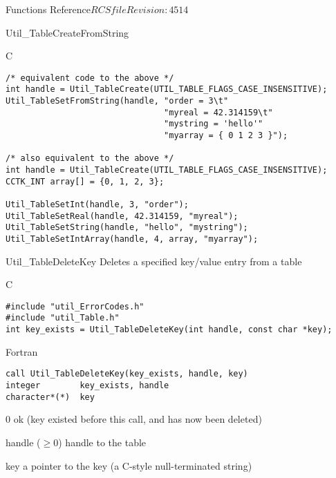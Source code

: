 \begin{cactuspart}{ Functions Reference}{$RCSfile$}{$Revision: 4514 $}
\begin{FunctionDescription}{Util\_TableCreateFromString}
\begin{ExampleSection}
\begin{Example}{C}
\begin{verbatim}
/* equivalent code to the above */
int handle = Util_TableCreate(UTIL_TABLE_FLAGS_CASE_INSENSITIVE);
Util_TableSetFromString(handle, "order = 3\t"
                                "myreal = 42.314159\t"
                                "mystring = 'hello'"
                                "myarray = { 0 1 2 3 }");

/* also equivalent to the above */
int handle = Util_TableCreate(UTIL_TABLE_FLAGS_CASE_INSENSITIVE);
CCTK_INT array[] = {0, 1, 2, 3};

Util_TableSetInt(handle, 3, "order");
Util_TableSetReal(handle, 42.314159, "myreal");
Util_TableSetString(handle, "hello", "mystring");
Util_TableSetIntArray(handle, 4, array, "myarray");
\end{verbatim}
\end{Example}
\end{ExampleSection}
\end{FunctionDescription}


\begin{FunctionDescription}{Util\_TableDeleteKey}
\label{Util-TableDeleteKey}
Deletes a specified key/value entry from a table

\begin{SynopsisSection}
\begin{Synopsis}{C}
\begin{verbatim}
#include "util_ErrorCodes.h"
#include "util_Table.h"
int key_exists = Util_TableDeleteKey(int handle, const char *key);
\end{verbatim}
\end{Synopsis}
\begin{Synopsis}{Fortran}
\begin{verbatim}
call Util_TableDeleteKey(key_exists, handle, key)
integer        key_exists, handle
character*(*)  key
\end{verbatim}
\end{Synopsis}
\end{SynopsisSection}

\begin{ResultSection}
\begin{Result}{\rm 0}
ok (key existed before this call, and has now been deleted)
\end{Result}
\end{ResultSection}

\begin{ParameterSection}
\begin{Parameter}{handle ($\ge 0$)}
handle to the table
\end{Parameter}
\begin{Parameter}{key}
a pointer to the key (a C-style null-terminated string)
\end{Parameter}
\end{ParameterSection}


\end{FunctionDescription}
\end{cactuspart}
